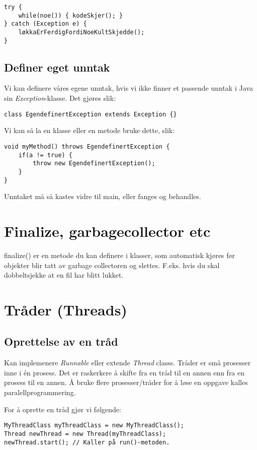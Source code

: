 \documentclass[a4paper,norsk,10pt]{article}
\begin{document}
\begin{verbatim}
try { 
    while(noe()) { kodeSkjer(); }
} catch (Exception e) {
    løkkaErFerdigFordiNoeKultSkjedde();
}
\end{verbatim}
\subsection{Definer eget unntak}
\label{sec-19.3}

Vi kan definere våres egene unntak, hvis vi ikke finner et passende
unntak i Java sin \emph{Exception}-klasse. Det gjøres slik:

\begin{verbatim}
class EgendefinertException extends Exception {}
\end{verbatim}

Vi kan så la en klasse eller en metode bruke dette, slik:

\begin{verbatim}
void myMethod() throws EgendefinertException {
    if(a != true) {
        throw new EgendefinertException();
    }
}
\end{verbatim}

Unntaket må så kastes vidre til main, eller fanges og behandles. 
\section{Finalize, garbagecollector etc}
\label{sec-20}

finalize() er en metode du kan definere i klasser, som automatisk
kjøres før objekter blir tatt av garbage collectoren og
slettes. F.eks. hvis du skal dobbeltsjekke at en fil har blitt lukket.
\section{Tråder (Threads)}
\label{sec-21}
\subsection{Oprettelse av en tråd}
\label{sec-21.1}

Kan implemenere \emph{Runnable} eller extende \emph{Thread} classs.
Tråder er små prosesser inne i én prosess. Det er raskerkere å 
skifte fra en tråd til en annen enn fra en prosess til en annen.
Å bruke flere prosesser/tråder for å løse en oppgave kalles
paralellprogrammering.

For å oprette en tråd gjør vi følgende:

\begin{verbatim}
MyThreadClass myThreadClass = new MyThreadClass();
Thread newThread = new Thread(myThreadClass);
newThread.start(); // Kaller på run()-metoden.
\end{verbatim}
\end{document}
